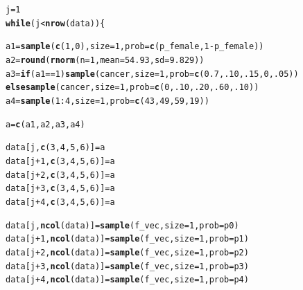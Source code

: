 \documentclass[fleqn,10pt]{wlscirep}\usepackage[]{graphicx}\usepackage[]{color}
\makeatletter
\newcommand{\hlnum}[1]{\textcolor[rgb]{0.686,0.059,0.569}{#1}}%
\newcommand{\hlopt}[1]{\textcolor[rgb]{0,0,0}{#1}}%
\newcommand{\hlstd}[1]{\textcolor[rgb]{0.345,0.345,0.345}{#1}}%
\newcommand{\hlkwa}[1]{\textcolor[rgb]{0.161,0.373,0.58}{\textbf{#1}}}%
\newcommand{\hlkwb}[1]{\textcolor[rgb]{0.69,0.353,0.396}{#1}}%
\newcommand{\hlkwc}[1]{\textcolor[rgb]{0.333,0.667,0.333}{#1}}%
\newcommand{\hlkwd}[1]{\textcolor[rgb]{0.737,0.353,0.396}{\textbf{#1}}}%
\newenvironment{kframe}{%
 \def\at@end@of@kframe{}%
 \ifinner\ifhmode%
  \def\at@end@of@kframe{\end{minipage}}%
  \begin{minipage}{\columnwidth}%
 \fi\fi%
 \def\FrameCommand##1{\hskip\@totalleftmargin \hskip-\fboxsep
 \colorbox{shadecolor}{##1}\hskip-\fboxsep
     \hskip-\linewidth \hskip-\@totalleftmargin \hskip\columnwidth}%
 \MakeFramed {\advance\hsize-\width
   \@totalleftmargin\z@ \linewidth\hsize
   \@setminipage}}%
 {\par\unskip\endMakeFramed%
 \at@end@of@kframe}
\newenvironment{knitrout}{}{} %
\makeatother
\begin{document}
\begin{knitrout}
\begin{kframe}
\begin{alltt}
  \hlstd{j} \hlkwb{=} \hlnum{1}
  \hlkwa{while} \hlstd{(j} \hlopt{<} \hlkwd{nrow}\hlstd{(data) )\{}

    \hlstd{a1} \hlkwb{=} \hlkwd{sample}\hlstd{(}\hlkwd{c}\hlstd{(}\hlnum{1}\hlstd{,}\hlnum{0}\hlstd{),} \hlkwc{size} \hlstd{=} \hlnum{1}\hlstd{,} \hlkwc{prob} \hlstd{=} \hlkwd{c}\hlstd{(p_female,} \hlnum{1}\hlopt{-}\hlstd{p_female))}
    \hlstd{a2} \hlkwb{=} \hlkwd{round}\hlstd{(}\hlkwd{rnorm}\hlstd{(}\hlkwc{n} \hlstd{=} \hlnum{1}\hlstd{,} \hlkwc{mean} \hlstd{=} \hlnum{54.93}\hlstd{,} \hlkwc{sd} \hlstd{=} \hlnum{9.829}\hlstd{))}
    \hlstd{a3} \hlkwb{=} \hlkwa{if} \hlstd{(a1} \hlopt{==} \hlnum{1}\hlstd{)} \hlkwd{sample}\hlstd{(cancer,} \hlkwc{size} \hlstd{=} \hlnum{1}\hlstd{,} \hlkwc{prob} \hlstd{=} \hlkwd{c}\hlstd{(}\hlnum{0.7}\hlstd{,} \hlnum{.10}\hlstd{,} \hlnum{.15}\hlstd{,} \hlnum{0}\hlstd{,} \hlnum{.05}\hlstd{) )}
          \hlkwa{else}  \hlkwd{sample}\hlstd{(cancer,} \hlkwc{size} \hlstd{=} \hlnum{1}\hlstd{,} \hlkwc{prob} \hlstd{=} \hlkwd{c}\hlstd{(}\hlnum{0}\hlstd{,} \hlnum{.10}\hlstd{,} \hlnum{.20}\hlstd{,} \hlnum{.60}\hlstd{,} \hlnum{.10}\hlstd{) )}
    \hlstd{a4} \hlkwb{=} \hlkwd{sample}\hlstd{(}\hlnum{1}\hlopt{:}\hlnum{4}\hlstd{,} \hlkwc{size} \hlstd{=} \hlnum{1}\hlstd{,} \hlkwc{prob} \hlstd{=} \hlkwd{c}\hlstd{(}\hlnum{43}\hlstd{,} \hlnum{49}\hlstd{,} \hlnum{59}\hlstd{,} \hlnum{19}\hlstd{) )}

    \hlstd{a} \hlkwb{=} \hlkwd{c}\hlstd{(a1, a2, a3, a4)}

    \hlstd{data[j,} \hlkwd{c}\hlstd{(}\hlnum{3}\hlstd{,} \hlnum{4}\hlstd{,} \hlnum{5}\hlstd{,} \hlnum{6}\hlstd{)]} \hlkwb{=} \hlstd{a}
    \hlstd{data[j}\hlopt{+}\hlnum{1}\hlstd{,} \hlkwd{c}\hlstd{(}\hlnum{3}\hlstd{,} \hlnum{4}\hlstd{,} \hlnum{5}\hlstd{,} \hlnum{6}\hlstd{)]} \hlkwb{=} \hlstd{a}
    \hlstd{data[j}\hlopt{+}\hlnum{2}\hlstd{,} \hlkwd{c}\hlstd{(}\hlnum{3}\hlstd{,} \hlnum{4}\hlstd{,} \hlnum{5}\hlstd{,} \hlnum{6}\hlstd{)]} \hlkwb{=} \hlstd{a}
    \hlstd{data[j}\hlopt{+}\hlnum{3}\hlstd{,} \hlkwd{c}\hlstd{(}\hlnum{3}\hlstd{,} \hlnum{4}\hlstd{,} \hlnum{5}\hlstd{,} \hlnum{6}\hlstd{)]} \hlkwb{=} \hlstd{a}
    \hlstd{data[j}\hlopt{+}\hlnum{4}\hlstd{,} \hlkwd{c}\hlstd{(}\hlnum{3}\hlstd{,} \hlnum{4}\hlstd{,} \hlnum{5}\hlstd{,} \hlnum{6}\hlstd{)]} \hlkwb{=} \hlstd{a}

    \hlstd{data[j,} \hlkwd{ncol}\hlstd{(data)]} \hlkwb{=} \hlkwd{sample}\hlstd{(f_vec,} \hlkwc{size} \hlstd{=} \hlnum{1}\hlstd{,} \hlkwc{prob} \hlstd{= p0)}
    \hlstd{data[j}\hlopt{+}\hlnum{1}\hlstd{,} \hlkwd{ncol}\hlstd{(data)]} \hlkwb{=} \hlkwd{sample}\hlstd{(f_vec,} \hlkwc{size} \hlstd{=} \hlnum{1}\hlstd{,} \hlkwc{prob} \hlstd{= p1)}
    \hlstd{data[j}\hlopt{+}\hlnum{2}\hlstd{,} \hlkwd{ncol}\hlstd{(data)]} \hlkwb{=} \hlkwd{sample}\hlstd{(f_vec,} \hlkwc{size} \hlstd{=} \hlnum{1}\hlstd{,} \hlkwc{prob} \hlstd{= p2)}
    \hlstd{data[j}\hlopt{+}\hlnum{3}\hlstd{,} \hlkwd{ncol}\hlstd{(data)]} \hlkwb{=} \hlkwd{sample}\hlstd{(f_vec,} \hlkwc{size} \hlstd{=} \hlnum{1}\hlstd{,} \hlkwc{prob} \hlstd{= p3)}
    \hlstd{data[j}\hlopt{+}\hlnum{4}\hlstd{,} \hlkwd{ncol}\hlstd{(data)]} \hlkwb{=} \hlkwd{sample}\hlstd{(f_vec,} \hlkwc{size} \hlstd{=} \hlnum{1}\hlstd{,} \hlkwc{prob} \hlstd{= p4)}


\end{alltt}
\end{kframe}
\end{knitrout}
\end{document}
